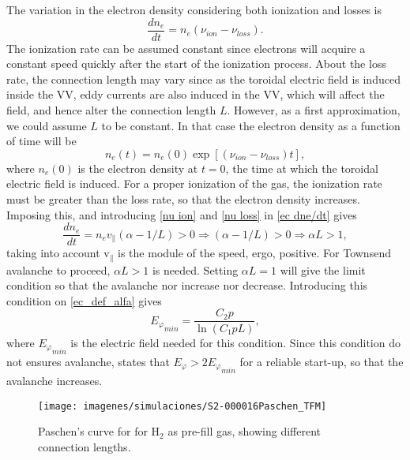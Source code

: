 \documentclass[a4paper,12pt,oneside]{book}
\begin{document}
The variation in the electron density considering both ionization and losses is
%
\begin{equation}\label{ec dne/dt}
\dfrac{d n_e}{dt}=n_e (\nu_{ion}-\nu_{loss}).
\end{equation}
The ionization rate can be assumed constant since electrons will acquire a constant speed quickly after the start of the ionization process. About the loss rate, the connection length may vary since as the toroidal electric field is induced inside the VV, eddy currents are also induced in the VV, which will affect the field, and hence alter the connection length $L$. However, as a first approximation, we could assume $L$ to be constant. In that case the electron density as a function of time will be
%
\begin{equation}\label{ec ne}
n_e(t)=n_e(0)\exp{ [(\nu_{ion}-\nu_{loss})t]},
\end{equation}
where $n_e(0)$ is the electron density at $t=0$, the time at which the toroidal electric field is induced. For a proper ionization of the gas, the ionization rate must be greater than the loss rate, so that the electron density increases. Imposing this, and introducing \eqref{nu ion} and \eqref{nu loss} in \eqref{ec dne/dt} gives
%
\begin{equation}
\dfrac{d n_e}{dt}=n_e v_{\parallel}(\alpha-1/L)>0 \Rightarrow (\alpha-1/L)>0 \Rightarrow \alpha L>1,
\end{equation}
taking into account v$_{\parallel}$ is the module of the speed, ergo, positive. For Townsend avalanche to proceed, $\alpha L>1$ is needed. Setting $\alpha L=1$  will give the limit condition so that the avalanche nor increase nor decrease. Introducing this condition on \eqref{ec_def_alfa} gives
%
\begin{equation}\label{ec Paschen}
{E_\varphi}_{min}=\dfrac{C_2 p}{\ln(C_1 p L)},
\end{equation}
where ${E_\varphi}_{min}$ is the electric field needed for this condition. Since this condition do not ensures avalanche, \cite{ITER_2007} states that $E_\varphi>2{E_\varphi}_{min}$ for a reliable start-up, so that the avalanche increases. 

\begin{wrapfigure}{r}{10cm}
\centering
\texttt{[image: imagenes/simulaciones/S2-000016Paschen\_TFM]}
\caption{Paschen's curve for for H$_2$ as pre-fill gas, showing different connection lengths.}
\label{fig_Paschen_ejemplo}
\end{wrapfigure}
\end{document}
